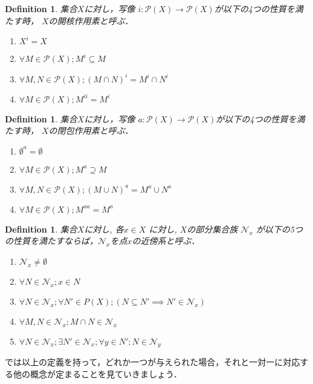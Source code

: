 \documentclass[dvipdfmx]{jbook}
\newtheorem{definition}[theorem]{Definition}
\theoremstyle{remark}
\theoremstyle{plain}
\begin{document}
\begin{definition}
	集合$X$に対し，写像 $i: \mathcal{P}(X) \to \mathcal{P}(X)$が以下の4つの性質を満たす時， $X$の開核作用素と呼ぶ．
	 \begin{enumerate}
		\item $X^{i}=X$
		\item $\forall M \in \mathcal{P}(X); M^{i}\subseteq M$
		\item $\forall M ,N \in \mathcal{P}(X); \left( M \cap N \right) ^{i} = M^{i} \cap N^{i}$
		\item $\forall M \in \mathcal{P}(X); M^{ii}= M^{i}$
	\end{enumerate}
\end{definition}

\begin{definition}
	集合$X$に対し，写像 $a: \mathcal{P}(X) \to \mathcal{P}(X)$が以下の4つの性質を満たす時， $X$の閉包作用素と呼ぶ．
	 \begin{enumerate}
		\item $\emptyset^{a}=\emptyset$
		\item $\forall M \in \mathcal{P}(X); M^{a}\supseteq M$
		\item $\forall M ,N \in \mathcal{P}(X); \left( M \cup N \right) ^{a} = M^{a} \cup N^{a}$
		\item $\forall M \in \mathcal{P}(X); M^{aa}= M^{a}$
	\end{enumerate}

\end{definition}

\begin{definition}
	集合$X$に対し, 各$x \in X$ に対し, $X$の部分集合族 $\mathcal{N}_x$ が以下の5つの性質を満たすならば，$\mathcal{N}_x$を点$x$の近傍系と呼ぶ．
	\begin{enumerate}
		\item $\mathcal{N}_x \neq \emptyset$
		\item $ \forall N \in \mathcal{N}_x; x \in N$
		\item $ \forall N \in \mathcal{N}_x; \forall N' \in P(X); \left( N \subseteq N' \implies N' \in \mathcal{N}_x \right) $ 
		\item $\forall M, N \in \mathcal{N}_x ; M  \cap N \in \mathcal{N}_x $ 
		\item $\forall N \in \mathcal{N}_x; \exists N' \in \mathcal{N}_x ; \forall y \in N'; N \in \mathcal{N}_y$
	\end{enumerate}
\end{definition}
 \newpage
では以上の定義を持って，どれか一つが与えられた場合，それと一対一に対応する他の概念が定まることを見ていきましょう．
\end{document}
